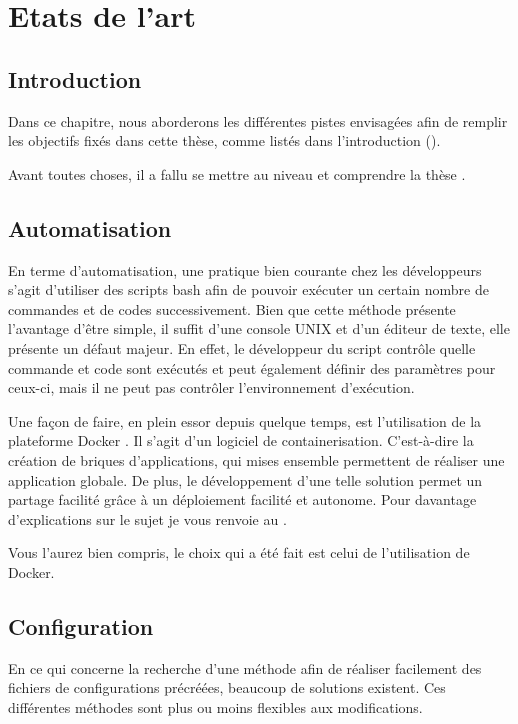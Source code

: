 \chapter{Etats de l'art}
\label{ch:state_art}

\section{Introduction}
Dans ce chapitre, nous aborderons les différentes pistes envisagées afin de remplir les objectifs fixés dans cette thèse, comme listés dans l'introduction ().

Avant toutes choses, il a fallu se mettre au niveau et comprendre la thèse \thLeite.

\section{Automatisation}
En terme d'automatisation, une pratique bien courante chez les développeurs s'agit d'utiliser des scripts bash afin de pouvoir exécuter un certain nombre de commandes et de codes successivement. Bien que cette méthode présente l'avantage d'être simple, il suffit d'une console UNIX et d'un éditeur de texte, elle présente un défaut majeur. En effet, le développeur du script contrôle quelle commande et code sont exécutés et peut également définir des paramètres pour ceux-ci, mais il ne peut pas contrôler l'environnement d'exécution.

Une façon de faire, en plein essor depuis quelque temps, est l'utilisation de la plateforme Docker \cite{1}. Il s'agit d'un logiciel de containerisation. C'est-à-dire la création de briques d'applications, qui mises ensemble permettent de réaliser une application globale. De plus, le développement d'une telle solution permet un partage facilité grâce à un déploiement facilité et autonome. Pour davantage d'explications sur le sujet je vous renvoie au  .

Vous l'aurez bien compris, le choix qui a été fait est celui de l'utilisation de Docker.

\section{Configuration}

En ce qui concerne la recherche d'une méthode afin de réaliser facilement des fichiers de configurations précréées, beaucoup de solutions existent. Ces différentes méthodes sont plus ou moins flexibles aux modifications.

